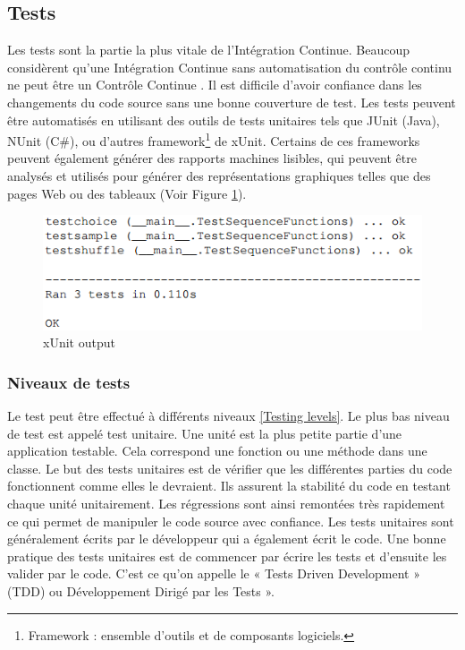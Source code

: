     \subsection{Tests}
    Les tests sont la partie la plus vitale de l’Intégration Continue. Beaucoup considèrent qu’une Intégration Continue sans automatisation du contrôle continu ne peut être un Contrôle Continue \cite{Duv07}. Il est difficile d'avoir confiance dans les changements du code source sans une bonne couverture de test. Les tests peuvent être automatisés en utilisant des outils de tests unitaires tels que JUnit (Java), NUnit (C\#), ou d'autres framework\footnote{Framework : ensemble d'outils et de composants logiciels.} de xUnit. Certains de ces frameworks peuvent également générer des rapports machines lisibles, qui peuvent être analysés et utilisés pour générer des représentations graphiques telles que des pages Web ou des tableaux (Voir Figure \ref{xUnit output}).

    \begin{figure}
      \begin{center}
        \includegraphics[scale=0.8]{images/tests.png}
      \end{center}
      \caption{xUnit output}
      \label{xUnit output}
    \end{figure}

      \subsubsection{Niveaux de tests}
      Le test peut être effectué à différents niveaux \ref{Testing levels}. Le plus bas niveau de test est appelé test unitaire. Une unité est la plus petite partie d’une application testable. Cela correspond une fonction ou une méthode dans une classe. Le but des tests unitaires est de vérifier que les différentes parties du code fonctionnent comme elles le devraient. Ils assurent la stabilité du code en testant chaque unité unitairement. Les régressions sont ainsi remontées très rapidement ce qui permet de manipuler le code source avec confiance. Les tests unitaires sont généralement écrits par le développeur qui a également écrit le code. Une bonne pratique des tests unitaires est de commencer par écrire les tests et d’ensuite les valider par le code. C’est ce qu’on appelle le « Tests Driven Development » (TDD) ou Développement Dirigé par les Tests ».\\

